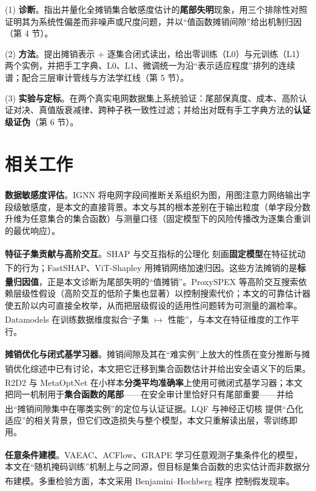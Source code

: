 \documentclass[10.5pt,compsoc,UTF8]{CjC}
\theoremstyle{mystyle}
\newcommand{\upcite}[1]{\textsuperscript{\cite{#1}}}
\begin{document}
(1) \textbf{诊断}。指出并量化全摊销集合敏感度估计的\textbf{尾部失明}现象，用三个排除性对照证明其为系统性偏差而非噪声或尺度问题，并以“值函数摊销间隙”给出机制归因（第 4 节）。

(2) \textbf{方法}。提出摊销表示 + 逐集合闭式读出，给出零训练（L0）与元训练（L1）两个实例，并把手工字典、L0、L1、微调统一为沿“表示适应程度”排列的连续谱；配合三层审计管线与方法学红线（第 5 节）。

(3) \textbf{实验与定标}。在两个真实电网数据集上系统验证：尾部保真度、成本、高阶认证对决、真值版衰减律、跨种子秩一致性过滤；并给出对既有手工字典方法的\textbf{认证级证伪}（第 6 节）。

\section{\heiti 相关工作}

\textbf{数据敏感度评估}。IGNN\upcite{hu2026ignn} 将电网字段间推断关系组织为图，用图注意力网络输出字段级敏感度，是本文的直接背景。本文与其的根本差别在于输出粒度（单字段分数升维为任意集合的集合函数）与测量口径（固定模型下的风险传播改为逐集合重训的最优响应）。

\textbf{特征子集贡献与高阶交互}。SHAP\upcite{lundberg2017shap} 与交互指标的公理化\upcite{grabisch1999interaction} 刻画\textbf{固定模型}在特征扰动下的行为；FastSHAP\upcite{jethani2022fastshap}、ViT-Shapley\upcite{covert2023vitshapley} 用摊销网络加速归因。这些方法摊销的是\textbf{标量归因值}，正是本文诊断为尾部失明的“值摊销”。ProxySPEX\upcite{kang2024proxyspex} 等高阶交互搜索依赖层级性假设（高阶交互的低阶子集也显著）以控制搜索代价；本文的可靠估计器使五阶以内可直接全枚举，从而把层级假设的适用性问题转为可测量的漏检率。Datamodels\upcite{ilyas2022datamodels} 在训练数据维度拟合“子集 $\mapsto$ 性能”，与本文在特征维度的工作平行。

\textbf{摊销优化与闭式基学习器}。摊销间隙及其在“难实例”上放大的性质在变分推断\upcite{cremer2018inference}与摊销优化综述\upcite{amos2023amortized}中已有讨论，本文把它迁移到集合函数估计并给出安全语义下的后果。R2D2\upcite{bertinetto2019r2d2} 与 MetaOptNet\upcite{lee2019metaoptnet} 在小样本\textbf{分类平均准确率}上使用可微闭式基学习器；本文把同一机制用于\textbf{集合函数的尾部}——在安全审计里恰好只有尾部重要——并给出“摊销间隙集中在哪类实例”的定位与认证证据。LQF\upcite{achille2021lqf} 与神经正切核\upcite{jacot2018ntk} 提供“凸化适应”的相关背景，但它们改造损失与整个模型，本文只重解读出层，零训练即用。

\textbf{任意条件建模}。VAEAC\upcite{ivanov2019vaeac}、ACFlow\upcite{li2020acflow}、GRAPE\upcite{you2020grape} 学习任意观测子集条件化的模型，本文在“随机掩码训练”机制上与之同源，但目标是集合函数的忠实估计而非数据分布建模。多重检验方面，本文采用 Benjamini--Hochberg 程序\upcite{benjamini1995fdr} 控制假发现率。
\end{document}
